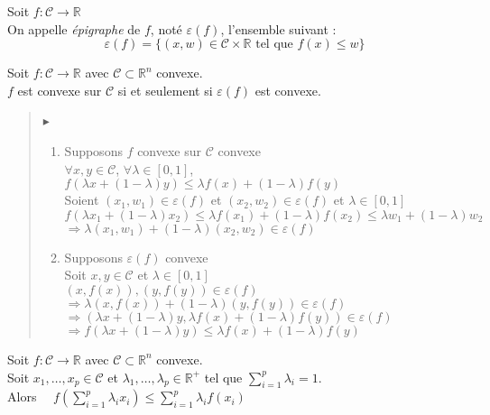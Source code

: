 \documentclass[12pt,a4paper]{article}
\newcommand{\propriete}[2]{%
    \begin{tcolorbox}[colback=white,colframe=green!25!white,title=\textbf{Propriété #1}, coltitle=black]
        #2
    \end{tcolorbox}
}
\newcommand{\definition}[2]{%
    \begin{tcolorbox}[colback=white,colframe=blue!25!white,title=\textbf{Définition #1}, coltitle=black]
        #2
    \end{tcolorbox}
}
\newcommand{\preuve}[1]{%
    \begin{quote}
        $\blacktriangleright$~#1
    \end{quote}
}
\begin{document}
\definition{- Epigraphe}{
    Soit $f : \mathcal{C} \rightarrow \mathbb{R}$\\
    On appelle \textit{épigraphe} de $f$, noté $\varepsilon(f)$, l'ensemble suivant :\\
    $$
    \varepsilon(f) = \{(x, w) \in \mathcal{C} \times \mathbb{R} \text{ tel que } f(x) \leq w\}
    $$
}

\propriete{}{
    Soit $f : \mathcal{C} \rightarrow \mathbb{R}$ avec $\mathcal{C} \subset \mathbb{R}^n$ convexe.\\
    $f$ est convexe sur $\mathcal{C}$ si et seulement si $\varepsilon(f)$ est convexe.
}

\preuve{
    \begin{enumerate}[label=\roman*)]
        \item Supposons $f$ convexe sur $\mathcal{C}$ convexe\\
        $\forall x, y \in \mathcal{C}$, $\forall \lambda \in [0, 1]$, $f(\lambda x + (1 - \lambda) y) \leq \lambda f(x) + (1 - \lambda) f(y)$\\
        Soient $(x_1, w_1) \in \varepsilon(f)$ et $(x_2, w_2) \in \varepsilon(f)$ et $\lambda \in [0, 1]$\\
        $f(\lambda x_1 + (1 - \lambda) x_2) \leq \lambda f(x_1) + (1 - \lambda) f(x_2) \leq \lambda w_1 + (1 - \lambda) w_2$\\
        $\Rightarrow \lambda (x_1, w_1) + (1 - \lambda) (x_2, w_2) \in \varepsilon(f)$
        
        \item Supposons $\varepsilon(f)$ convexe\\
        Soit $x, y \in \mathcal{C}$ et $\lambda \in [0, 1]$\\
        $(x, f(x)), (y, f(y)) \in \varepsilon(f)$\\
        $\Rightarrow \lambda (x, f(x)) + (1 - \lambda) (y, f(y)) \in \varepsilon(f)$\\
        $\Rightarrow (\lambda x + (1 - \lambda) y, \lambda f(x) + (1 - \lambda) f(y)) \in \varepsilon(f)$\\
        $\Rightarrow f(\lambda x + (1 - \lambda) y) \leq \lambda f(x) + (1 - \lambda) f(y)$\\
    \end{enumerate}    
}


\propriete{- Inégalité de Jensen}{
    Soit $f : \mathcal{C} \rightarrow \mathbb{R}$ avec $\mathcal{C} \subset \mathbb{R}^n$ convexe.\\
    Soit $x_1, \dots, x_p \in \mathcal{C}$ et $\lambda_1, \dots, \lambda_p \in \mathbb{R}^+$ tel que $\sum_{i=1}^p \lambda_i = 1$.\\

    Alors $\quad f(\sum_{i=1}^p \lambda_i x_i) \leq \sum_{i=1}^p \lambda_i f(x_i)$
}
\end{document}
